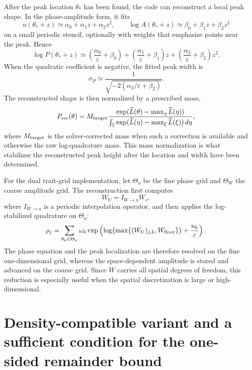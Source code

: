 \documentclass[11pt]{article}
\begin{document}
After the peak location \(\theta_*\) has been found, the code can reconstruct a
local peak shape.  In the phase-amplitude form, it fits
\[
    u(\theta_*+z)\simeq \alpha_0+\alpha_1z+\alpha_2z^2,
    \qquad
    \log A(\theta_*+z)\simeq \beta_0+\beta_1z+\beta_2z^2
\]
on a small periodic stencil, optionally with weights that emphasize points near
the peak.  Hence
\[
    \log P(\theta_*+z)
    \simeq
    \left(\frac{\alpha_0}{\varepsilon}+\beta_0\right)
    +\left(\frac{\alpha_1}{\varepsilon}+\beta_1\right)z
    +\left(\frac{\alpha_2}{\varepsilon}+\beta_2\right)z^2 .
\]
When the quadratic coefficient is negative, the fitted peak width is
\begin{equation}\label{eq:appendix_peak_width_new}
    \sigma_P\simeq \frac{1}{\sqrt{-2(\alpha_2/\varepsilon+\beta_2)}}.
\end{equation}
The reconstructed shape is then normalized by a prescribed mass,
\begin{equation}\label{eq:appendix_mass_shape_new}
    P_{\rm rec}(\theta)
    =M_{\rm target}
    \frac{\exp(\widehat L(\theta)-\max_\eta\widehat L(\eta))}
    {\int_{\mathbb T}\exp(\widehat L(\eta)-\max_\xi\widehat L(\xi))\,d\eta},
\end{equation}
where \(M_{\rm target}\) is the solver-corrected mass when such a correction is
available and otherwise the raw log-quadrature mass.  This mass normalization is
what stabilizes the reconstructed peak height after the location and width have
been determined.

For the dual trait-grid implementation, let \(\Theta_u\) be the fine phase grid
and \(\Theta_W\) the coarse amplitude grid.  The reconstruction first computes
\[
    W_U=I_{W\to u}W_c,
\]
where \(I_{W\to u}\) is a periodic interpolation operator, and then applies the
log-stabilized quadrature on \(\Theta_u\):
\[
    \rho_j=\sum_{\theta_k\in\Theta_u}\omega_k
    \exp\left(\log\bigl(\max\{(W_U)_{j,k},W_{\rm floor}\}\bigr)
    +\frac{u_k}{\varepsilon}\right).
\]
The phase equation and the peak localization are therefore resolved on the fine
one-dimensional grid, whereas the space-dependent amplitude is stored and
advanced on the coarse grid.  Since \(W\) carries all spatial degrees of
freedom, this reduction is especially useful when the spatial discretization is
large or high-dimensional.


\section{Density-compatible variant and a sufficient condition for the one-sided remainder bound}
\label{app:density_compatible}
\end{document}

